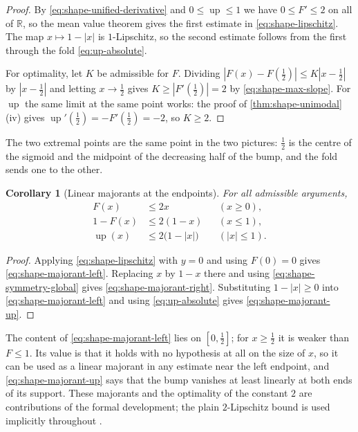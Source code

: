 \documentclass[11pt,oneside]{article}
\newtheorem{corollary}[theorem]{Corollary}
\theoremstyle{definition}
\theoremstyle{remark}
\newcommand{\R}{\mathbb R}
\newcommand{\Up}{\operatorname{up}}
\begin{document}
\begin{proof}
By \eqref{eq:shape-unified-derivative} and $0\le\Up\le1$ we have $0\le F'\le2$ on all of
$\R$, so the mean value theorem gives the first estimate in \eqref{eq:shape-lipschitz}.  The
map $x\mapsto1-|x|$ is $1$-Lipschitz, so the second estimate follows from the first through
the fold \eqref{eq:up-absolute}.

For optimality, let $K$ be admissible for $F$.  Dividing $|F(x)-F(\tfrac12)|\le K|x-\tfrac12|$
by $|x-\tfrac12|$ and letting $x\to\tfrac12$ gives $K\ge|F'(\tfrac12)|=2$ by
\eqref{eq:shape-max-slope}.  For $\Up$ the same limit at the same point works: the proof of
\cref{thm:shape-unimodal}(iv) gives $\Up'(\tfrac12)=-F'(\tfrac12)=-2$, so $K\ge2$.
\end{proof}

The two extremal points are the same point in the two pictures: $\tfrac12$ is the centre of
the sigmoid and the midpoint of the decreasing half of the bump, and the fold sends one to
the other.

\begin{corollary}[Linear majorants at the endpoints]
\label{thm:shape-majorants}
For all admissible arguments,
\begin{align}
 F(x)&\le2x                       &&(x\ge0),   \label{eq:shape-majorant-left}\\
 1-F(x)&\le2(1-x)                 &&(x\le1),   \label{eq:shape-majorant-right}\\
 \Up(x)&\le2\bigl(1-|x|\bigr)     &&(|x|\le1). \label{eq:shape-majorant-up}
\end{align}
\end{corollary}

\begin{proof}
Applying \eqref{eq:shape-lipschitz} with $y=0$ and using $F(0)=0$ gives
\eqref{eq:shape-majorant-left}.  Replacing $x$ by $1-x$ there and using
\eqref{eq:shape-symmetry-global} gives \eqref{eq:shape-majorant-right}.  Substituting
$1-|x|\ge0$ into \eqref{eq:shape-majorant-left} and using \eqref{eq:up-absolute} gives
\eqref{eq:shape-majorant-up}.
\end{proof}

The content of \eqref{eq:shape-majorant-left} lies on $[0,\tfrac12]$; for $x\ge\tfrac12$ it is
weaker than $F\le1$.  Its value is that it holds with no hypothesis at all on the size of
$x$, so it can be used as a linear majorant in any estimate near the left endpoint, and
\eqref{eq:shape-majorant-up} says that the bump vanishes at least linearly at both ends of
its support.  These majorants and the optimality of the constant $2$ are contributions of the
formal development; the plain $2$-Lipschitz bound is used implicitly throughout
\cite{arias1982,rvachev1990}.
\end{document}
